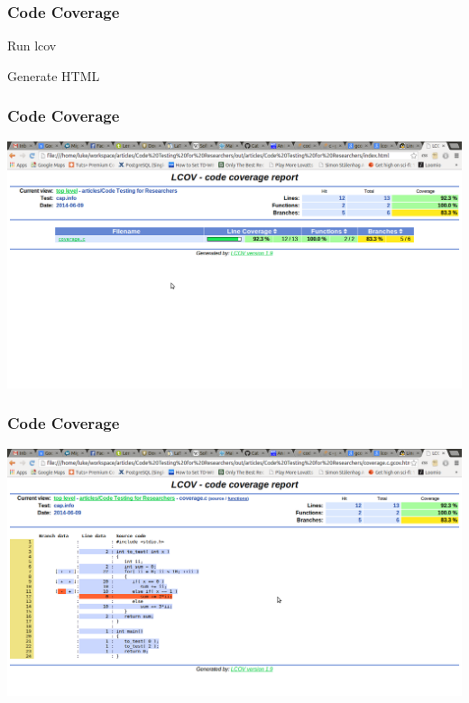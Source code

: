 \begin{frame}[fragile]
  \frametitle{Code Coverage}
  \begin{block}{Run lcov}
    \vspace{0.2cm}
    \hspace{0.2cm}{\ttfamily lcov -c --directory . --output-file results.info}
    \vspace{0.2cm}
  \end{block}
  \vspace{1cm}
  \begin{block}{Generate HTML}
    \vspace{0.2cm}
    \hspace{0.2cm}{\ttfamily genhtml results.info --output-directory html}
    \vspace{0.2cm}
  \end{block}
\end{frame}

\begin{frame}
  \frametitle{Code Coverage}
  \includegraphics[width=\textwidth]{gcov-1.png}
\end{frame}

\begin{frame}
  \frametitle{Code Coverage}
  \includegraphics[width=\textwidth]{gcov-2.png}
\end{frame}
